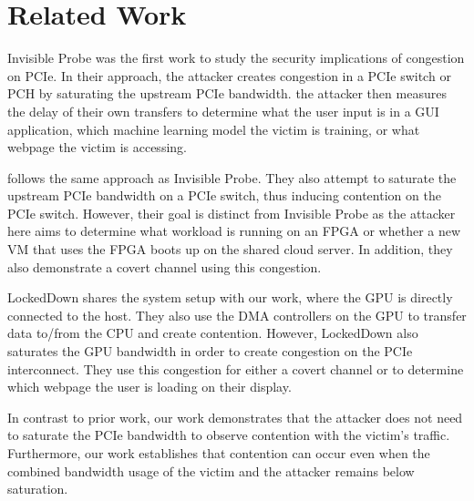 \section{Related Work}
\label{sec:interconnect-sc-related-work}

Invisible Probe \cite{tan2021invisible} was the first work to study the security implications of congestion on PCIe.
In their approach, the attacker creates congestion in a PCIe switch or PCH by saturating the upstream PCIe bandwidth.
the attacker then measures the delay of their own transfers to determine what the user input is in a GUI application, which machine learning model the victim is training, or what webpage the victim is accessing.

\citet{giechaskiel2022cross} follows the same approach as Invisible Probe.
They also attempt to saturate the upstream PCIe bandwidth on a PCIe switch, thus inducing contention on the PCIe switch.
However, their goal is distinct from Invisible Probe as the attacker here aims to determine what workload is running on an FPGA or whether a new VM that uses the FPGA boots up on the shared cloud server.
In addition, they also demonstrate a covert channel using this congestion.

LockedDown \cite{side2022lockeddown} shares the system setup with our work, where the GPU is directly connected to the host.
They also use the DMA controllers on the GPU to transfer data to/from the CPU and create contention.
However, LockedDown also saturates the GPU bandwidth in order to create congestion on the PCIe interconnect.
They use this congestion for either a covert channel or to determine which webpage the user is loading on their display.

In contrast to prior work, our work demonstrates that the attacker does not need to saturate the PCIe bandwidth to observe contention with the victim's traffic. 
Furthermore, our work establishes that contention can occur even when the combined bandwidth usage of the victim and the attacker remains below saturation.